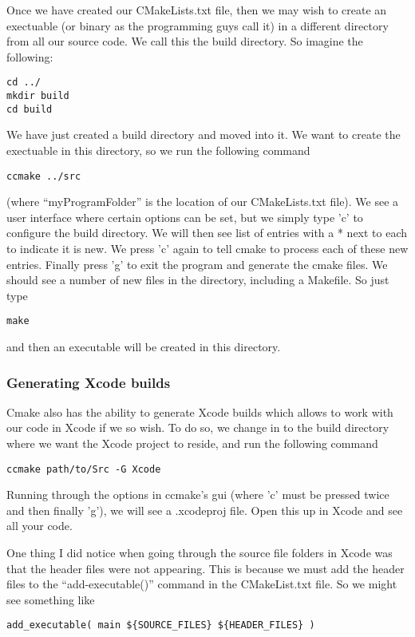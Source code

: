 \documentclass[a4paper, 10pt]{article}
\begin{document}
Once we have created our CMakeLists.txt file, then we may wish to
create an exectuable (or binary as the programming guys call it) in a
different directory from all our source code. We call this the build
directory. So imagine the following:
\begin{verbatim}
cd ../
mkdir build
cd build
\end{verbatim}
We have just created a build directory and moved into it. We want to
create the exectuable in this directory, so we run the following
command
\begin{verbatim}
ccmake ../src
\end{verbatim}
(where ``myProgramFolder'' is the location of our CMakeLists.txt
file). We see a user interface where certain options can be set, but
we simply type 'c' to configure the build directory. We will then see
list of entries with a * next to each to indicate it is new. We press
'c' again to tell cmake to process each of these new entries. Finally press 'g' to exit the
program and generate the cmake files. We should see a number of new files in the directory,
including a Makefile. So just type
\begin{verbatim}
make
\end{verbatim}
and then an executable will be created in this directory. 

\subsubsection*{Generating Xcode builds}
\label{sec:gener-xcode-builds}

Cmake also has the ability to generate Xcode builds which allows to
work with our code in Xcode if we so wish. To do so, we change in to
the build directory where we want the Xcode project to reside, and run
the following command 
\begin{verbatim}
ccmake path/to/Src -G Xcode
\end{verbatim}
Running through the options in ccmake's gui (where 'c' must be pressed twice
and then finally 'g'), we will see a .xcodeproj file. Open this up in
Xcode and see all your code.

One thing I did notice when going through the source file folders in
Xcode was that the header files were not appearing. This is because we
must add the header files to the ``add-executable()'' command in the
CMakeList.txt file. So we might see something like
\begin{verbatim}
add_executable( main ${SOURCE_FILES} ${HEADER_FILES} )
\end{verbatim}
\end{document}
